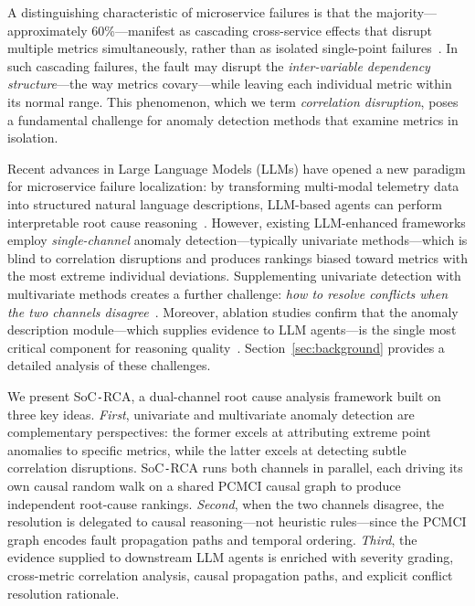 \documentclass[a4paper,fleqn]{cas-dc}
\newcommand{\sysname}{SoC\texttt{-}RCA}
\begin{document}
A distinguishing characteristic of microservice failures is that the majority---approximately 60\%---manifest as cascading cross-service effects that disrupt multiple metrics simultaneously, rather than as isolated single-point failures~\cite{10.1145/3542929.3563482}.  In such cascading failures, the fault may disrupt the \emph{inter-variable dependency structure}---the way metrics covary---while leaving each individual metric within its normal range.  This phenomenon, which we term \emph{correlation disruption}, poses a fundamental challenge for anomaly detection methods that examine metrics in isolation.

Recent advances in Large Language Models (LLMs) have opened a new paradigm for microservice failure localization: by transforming multi-modal telemetry data into structured natural language descriptions, LLM-based agents can perform interpretable root cause reasoning~\cite{11449471,10.1145/3627703.3629553,10.1145/3627673.3680016}.  However, existing LLM-enhanced frameworks employ \emph{single-channel} anomaly detection---typically univariate methods---which is blind to correlation disruptions and produces rankings biased toward metrics with the most extreme individual deviations.  Supplementing univariate detection with multivariate methods creates a further challenge: \emph{how to resolve conflicts when the two channels disagree}~\cite{DBLP:journals/pvldb/TuliCJ22,10.1145/3394486.3403392,deng2021graph}.  Moreover, ablation studies confirm that the anomaly description module---which supplies evidence to LLM agents---is the single most critical component for reasoning quality~\cite{11449471}.  Section~\ref{sec:background} provides a detailed analysis of these challenges.

We present \sysname{}, a dual-channel root cause analysis framework built on three key ideas.  \emph{First}, univariate and multivariate anomaly detection are complementary perspectives: the former excels at attributing extreme point anomalies to specific metrics, while the latter excels at detecting subtle correlation disruptions.  \sysname{} runs both channels in parallel, each driving its own causal random walk on a shared PCMCI causal graph to produce independent root-cause rankings.  \emph{Second}, when the two channels disagree, the resolution is delegated to causal reasoning---not heuristic rules---since the PCMCI graph encodes fault propagation paths and temporal ordering.  \emph{Third}, the evidence supplied to downstream LLM agents is enriched with severity grading, cross-metric correlation analysis, causal propagation paths, and explicit conflict resolution rationale.
\end{document}
